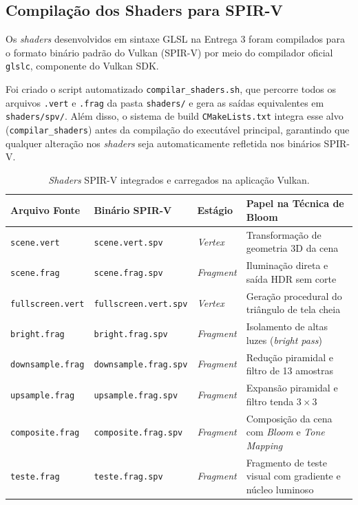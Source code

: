 \subsection{Compilação dos Shaders para SPIR-V}
Os \textit{shaders} desenvolvidos em sintaxe GLSL na Entrega 3 foram compilados para o formato binário padrão do Vulkan (SPIR-V) por meio do compilador oficial \texttt{glslc}, componente do Vulkan SDK.

Foi criado o script automatizado \texttt{compilar\_shaders.sh}, que percorre todos os arquivos \texttt{.vert} e \texttt{.frag} da pasta \texttt{shaders/} e gera as saídas equivalentes em \texttt{shaders/spv/}. Além disso, o sistema de build \texttt{CMakeLists.txt} integra esse alvo (\texttt{compilar\_shaders}) antes da compilação do executável principal, garantindo que qualquer alteração nos \textit{shaders} seja automaticamente refletida nos binários SPIR-V.

\begin{table}[H]
    \centering
    \caption{\textit{Shaders} SPIR-V integrados e carregados na aplicação Vulkan.}
    \label{tab:shaders_spv}
    \vspace{4pt}
    \small
    \begin{tabular}{l l l p{6.5cm}}
        \toprule
        \textbf{Arquivo Fonte} & \textbf{Binário SPIR-V} & \textbf{Estágio} & \textbf{Papel na Técnica de Bloom} \\
        \midrule
        \texttt{scene.vert} & \texttt{scene.vert.spv} & \textit{Vertex} & Transformação de geometria 3D da cena \\
        \texttt{scene.frag} & \texttt{scene.frag.spv} & \textit{Fragment} & Iluminação direta e saída HDR sem corte \\
        \texttt{fullscreen.vert} & \texttt{fullscreen.vert.spv} & \textit{Vertex} & Geração procedural do triângulo de tela cheia \\
        \texttt{bright.frag} & \texttt{bright.frag.spv} & \textit{Fragment} & Isolamento de altas luzes (\textit{bright pass}) \\
        \texttt{downsample.frag} & \texttt{downsample.frag.spv} & \textit{Fragment} & Redução piramidal e filtro de 13 amostras \\
        \texttt{upsample.frag} & \texttt{upsample.frag.spv} & \textit{Fragment} & Expansão piramidal e filtro tenda $3\times3$ \\
        \texttt{composite.frag} & \texttt{composite.frag.spv} & \textit{Fragment} & Composição da cena com \textit{Bloom} e \textit{Tone Mapping} \\
        \texttt{teste.frag} & \texttt{teste.frag.spv} & \textit{Fragment} & Fragmento de teste visual com gradiente e núcleo luminoso \\
        \bottomrule
    \end{tabular}
\end{table}

